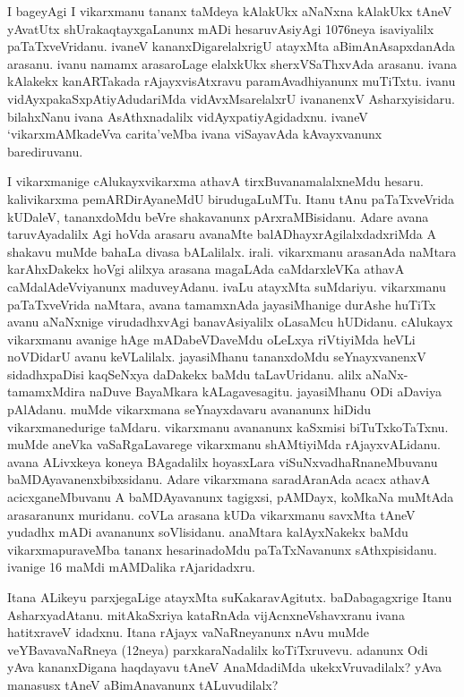 \documentclass[11pt,a4size]{article}
\begin{document}
I bageyAgi I vikarxmanu tananx taMdeya kAlakUkx aNaNxna kAlakUkx tAneV
yAvatUtx shUrakaqtayxgaLanunx mADi hesaruvAsiyAgi 1076neya isaviyalilx
paTaTxveVridanu. ivaneV kananxDigarelalxrigU atayxMta
aBimAnAsapxdanAda arasanu. ivanu namamx arasaroLage elalxkUkx
sherxVSaThxvAda arasanu. ivana kAlakekx kanARTakada rAjayxvisAtxravu
paramAvadhiyanunx muTiTxtu. ivanu vidAyxpakaSxpAtiyAdudariMda
vidAvxMsarelalxrU ivananenxV Asharxyisidaru. bilahxNanu ivana
AsAthxnadalilx vidAyxpatiyAgidadxnu. ivaneV `vikarxmAMkadeVva
carita'veMba ivana viSayavAda kAvayxvanunx barediruvanu.

I vikarxmanige cAlukayxvikarxma athavA tirxBuvanamalalxneMdu
hesaru. kalivikarxma pemARDirAyaneMdU birudugaLuMTu. Itanu tAnu
paTaTxveVrida kUDaleV, tananxdoMdu beVre shakavanunx
pArxraMBisidanu. Adare avana taruvAyadalilx Agi hoVda arasaru avanaMte
balADhayxrAgilalxdadxriMda A shakavu muMde bahaLa divasa
bALalilalx. irali. vikarxmanu arasanAda naMtara karAhxDakekx hoVgi
alilxya arasana magaLAda caMdarxleVKa athavA caMdalAdeVviyanunx
maduveyAdanu. ivaLu atayxMta suMdariyu. vikarxmanu paTaTxveVrida
naMtara, avana tamamxnAda jayasiMhanige durAshe huTiTx avanu aNaNxnige
virudadhxvAgi banavAsiyalilx oLasaMcu hUDidanu. cAlukayx vikarxmanu
avanige hAge mADabeVDaveMdu oLeLxya riVtiyiMda heVLi noVDidarU avanu
keVLalilalx. jayasiMhanu tananxdoMdu seYnayxvanenxV sidadhxpaDisi
kaqSeNxya daDakekx baMdu taLavUridanu. alilx aNaNx-tamamxMdira naDuve
BayaMkara kALagavesagitu. jayasiMhanu ODi aDaviya pAlAdanu. muMde
vikarxmana seYnayxdavaru avananunx hiDidu vikarxmanedurige
taMdaru. vikarxmanu avananunx kaSxmisi biTuTxkoTaTxnu. muMde aneVka
vaSaRgaLavarege vikarxmanu shAMtiyiMda rAjayxvALidanu. avana ALivxkeya
koneya BAgadalilx hoyasxLara viSuNxvadhaRnaneMbuvanu
baMDAyavanenxbibxsidanu. Adare vikarxmana saradAranAda acacx athavA
acicxganeMbuvanu A baMDAyavanunx tagigxsi, pAMDayx, koMkaNa muMtAda
arasaranunx muridanu. coVLa arasana kUDa vikarxmanu savxMta tAneV
yudadhx mADi avananunx soVlisidanu. anaMtara kalAyxNakekx baMdu
vikarxmapuraveMba tananx hesarinadoMdu paTaTxNavanunx
sAthxpisidanu. ivanige 16 maMdi mAMDalika rAjaridadxru.

Itana ALikeyu parxjegaLige atayxMta suKakaravAgitutx. baDabagagxrige
Itanu AsharxyadAtanu. mitAkaSxriya kataRnAda vijAcnxneVshavxranu ivana
hatitxraveV idadxnu. Itana rAjayx vaNaRneyanunx nAvu muMde
veYBavavaNaRneya (12neya) parxkaraNadalilx koTiTxruvevu. adanunx Odi
yAva kananxDigana haqdayavu tAneV AnaMdadiMda ukekxVruvadilalx? yAva
manasusx tAneV aBimAnavanunx tALuvudilalx?
\end{document}

